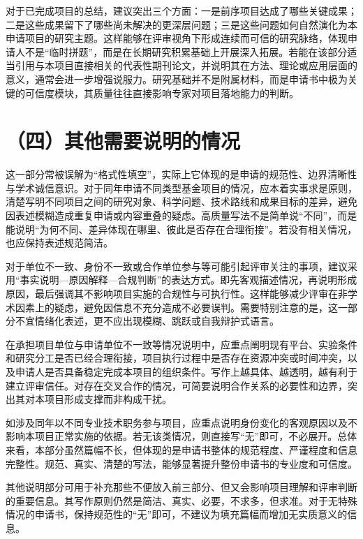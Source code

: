 \documentclass[12pt,UTF8,AutoFakeBold=2,a4paper]{ctexart}
\begin{document}
	\NSFCFoundationFour
	
	对于已完成项目的总结，建议突出三个方面：一是前序项目达成了哪些关键成果；二是这些成果留下了哪些尚未解决的更深层问题；三是这些问题如何自然演化为本申请项目的研究主题。这样能够在评审视角下形成连续而可信的研究脉络，体现申请人不是“临时拼题”，而是在长期研究积累基础上开展深入拓展。若能在该部分适当引用与本项目直接相关的代表性期刊论文，并说明其在方法、理论或应用层面的意义，通常会进一步增强说服力。研究基础并不是附属材料，而是申请书中极为关键的可信度模块，其质量往往直接影响专家对项目落地能力的判断\cite{Bromham2016,Hoppe2019}。
	
	\section{（四）其他需要说明的情况}
	
	\NSFCOtherOne
	
	这一部分常被误解为“格式性填空”，实际上它体现的是申请的规范性、边界清晰性与学术诚信意识。对于同年申请不同类型基金项目的情况，应本着实事求是原则，清楚写明不同项目之间的研究对象、科学问题、技术路线和成果目标的差异，避免因表述模糊造成重复申请或内容重叠的疑虑。高质量写法不是简单说“不同”，而是能说明“为何不同、差异体现在哪里、彼此是否存在合理衔接”。若没有相关情况，也应保持表述规范简洁。
	
	\NSFCOtherTwo
	
	对于单位不一致、身份不一致或合作单位参与等可能引起评审关注的事项，建议采用“事实说明—原因解释—合规判断”的表达方式。即先客观描述情况，再说明形成原因，最后强调其不影响项目实施的合规性与可执行性。这样能够减少评审在非学术因素上的疑虑，避免因信息不充分造成不必要误判。需要特别注意的是，这一部分不宜情绪化表述，更不应出现模糊、跳跃或自我辩护式语言。
	
	\NSFCOtherThree
	
	在承担项目单位与申请单位不一致等情况说明中，应重点阐明现有平台、实验条件和研究分工是否已经合理衔接，项目执行过程中是否存在资源冲突或时间冲突，以及申请人是否具备稳定完成本项目的组织条件。写作上越具体、越透明，越有利于建立评审信任。对存在交叉合作的情况，可简要说明合作关系的必要性和边界，突出其对本项目形成支撑而非构成干扰。
	
	\NSFCOtherFour
	
	如涉及同年以不同专业技术职务参与项目，应重点说明身份变化的客观原因以及不影响本项目正常实施的依据。若无该类情况，则直接写“无”即可，不必展开。总体来看，本部分虽然篇幅不长，但体现的是申请书整体的规范程度、严谨程度和信息完整性。规范、真实、清楚的写法，能够显著提升整份申请书的专业度和可信度\cite{Fortin2014,Nicholas2019}。
	
	\NSFCOtherFive
	
	其他说明部分可用于补充那些不便放入前三部分、但又会影响项目理解和评审判断的重要信息。其写作原则仍然是简洁、真实、必要，不求多，但求准。对于无特殊情况的申请书，保持规范性的“无”即可，不建议为填充篇幅而增加无实质意义的信息。
	
\end{document}
